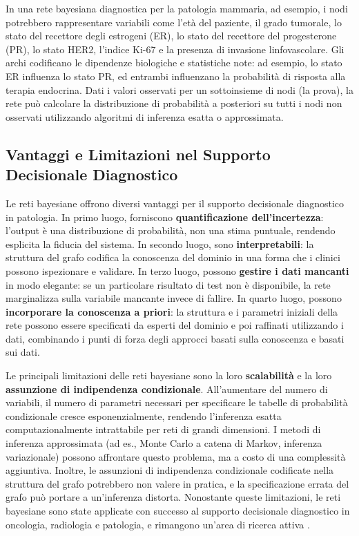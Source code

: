 In una rete bayesiana diagnostica per la patologia mammaria, ad esempio, i nodi potrebbero rappresentare variabili come l'età del paziente, il grado tumorale, lo stato del recettore degli estrogeni (ER), lo stato del recettore del progesterone (PR), lo stato HER2, l'indice Ki-67 e la presenza di invasione linfovascolare. Gli archi codificano le dipendenze biologiche e statistiche note: ad esempio, lo stato ER influenza lo stato PR, ed entrambi influenzano la probabilità di risposta alla terapia endocrina. Dati i valori osservati per un sottoinsieme di nodi (la prova), la rete può calcolare la distribuzione di probabilità a posteriori su tutti i nodi non osservati utilizzando algoritmi di inferenza esatta o approssimata.

\subsection{Vantaggi e Limitazioni nel Supporto Decisionale Diagnostico}

Le reti bayesiane offrono diversi vantaggi per il supporto decisionale diagnostico in patologia. In primo luogo, forniscono \textbf{quantificazione dell'incertezza}: l'output è una distribuzione di probabilità, non una stima puntuale, rendendo esplicita la fiducia del sistema. In secondo luogo, sono \textbf{interpretabili}: la struttura del grafo codifica la conoscenza del dominio in una forma che i clinici possono ispezionare e validare. In terzo luogo, possono \textbf{gestire i dati mancanti} in modo elegante: se un particolare risultato di test non è disponibile, la rete marginalizza sulla variabile mancante invece di fallire. In quarto luogo, possono \textbf{incorporare la conoscenza a priori}: la struttura e i parametri iniziali della rete possono essere specificati da esperti del dominio e poi raffinati utilizzando i dati, combinando i punti di forza degli approcci basati sulla conoscenza e basati sui dati.

Le principali limitazioni delle reti bayesiane sono la loro \textbf{scalabilità} e la loro \textbf{assunzione di indipendenza condizionale}. All'aumentare del numero di variabili, il numero di parametri necessari per specificare le tabelle di probabilità condizionale cresce esponenzialmente, rendendo l'inferenza esatta computazionalmente intrattabile per reti di grandi dimensioni. I metodi di inferenza approssimata (ad es., Monte Carlo a catena di Markov, inferenza variazionale) possono affrontare questo problema, ma a costo di una complessità aggiuntiva. Inoltre, le assunzioni di indipendenza condizionale codificate nella struttura del grafo potrebbero non valere in pratica, e la specificazione errata del grafo può portare a un'inferenza distorta. Nonostante queste limitazioni, le reti bayesiane sono state applicate con successo al supporto decisionale diagnostico in oncologia, radiologia e patologia, e rimangono un'area di ricerca attiva \cite{rashidi2019}.

